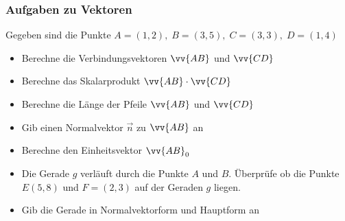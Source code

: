 \subsubsection{Aufgaben zu Vektoren}
\begin{aufgabe}
Gegeben sind die Punkte \(A=(1,2),\;B=(3,5),\;C=(3,3),\;D=(1,4)\)
    \begin{itemize}
        \item[1.] Berechne die Verbindungsvektoren \(\vv{AB}\) und \(\vv{CD}\)
        \item[2.] Berechne das Skalarprodukt \(\vv{AB} \cdot \vv{CD}\)
        \item[3.] Berechne die Länge der Pfeile \(\vv{AB}\) und \(\vv{CD}\)
        \item[4.] Gib einen Normalvektor \(\vec{n}\) zu \(\vv{AB}\) an
        \item[5.] Berechne den Einheitsvektor \(\vv{AB}_0\)
        \item[6.] Die Gerade $g$ verläuft durch die Punkte $A$ und $B$. Überprüfe ob die Punkte \(E(5,8)\) und \(F=(2,3)\) auf der Geraden $g$ liegen.
        \item[7.] Gib die Gerade in Normalvektorform und Hauptform an
    \end{itemize}
\end{aufgabe}
